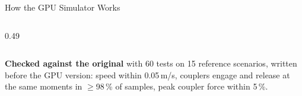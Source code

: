 \documentclass[aspectratio=169,11pt]{beamer}
\begin{document}
\begin{frame}{How the GPU Simulator Works}
\begin{columns}[T,onlytextwidth]
\begin{column}{0.49\textwidth}
      \vspace{0.35em}
    \end{column}
  \end{columns}

  \vspace{0.4em}
  {\scriptsize
  \textbf{Checked against the original} with 60 tests on 15 reference
  scenarios, written before the GPU version: speed within 0.05\,m/s, couplers
  engage and release at the same moments in $\ge$98\,\% of samples, peak
  coupler force within 5\,\%.\par}
\end{frame}
\end{document}
